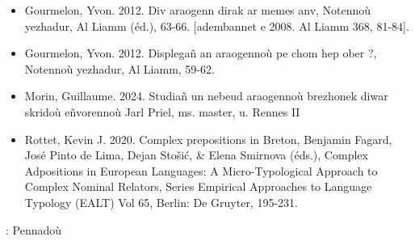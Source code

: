\begin{itemize} \tightlist \item   Gourmelon, Yvon. 2012. \textquotesingle Div araogenn dirak ar memes   anv\textquotesingle, Notennoù yezhadur, Al Liamm (éd.), 63-66.   {[}adembannet e 2008. Al Liamm 368, 81-84{]}. \item   Gourmelon, Yvon. 2012. \textquotesingle Displegañ an araogennoù pe   chom hep ober ?\textquotesingle, Notennoù yezhadur, Al Liamm, 59-62. \item   Morin, Guillaume. 2024. Studiañ un nebeud araogennoù brezhonek diwar   skridoù eñvorennoù Jarl Priel, ms. master, u. Rennes II \item   Rottet, Kevin J. 2020. \textquotesingle Complex prepositions in   Breton\textquotesingle, Benjamin Fagard, José Pinto de Lima, Dejan   Stošić, \& Elena Smirnova (éds.), Complex Adpositions in European   Languages: A Micro-Typological Approach to Complex Nominal Relators,   Series Empirical Approaches to Language Typology (EALT) Vol 65,   Berlin: De Gruyter, 195-231. \end{itemize}

: Pennadoù 